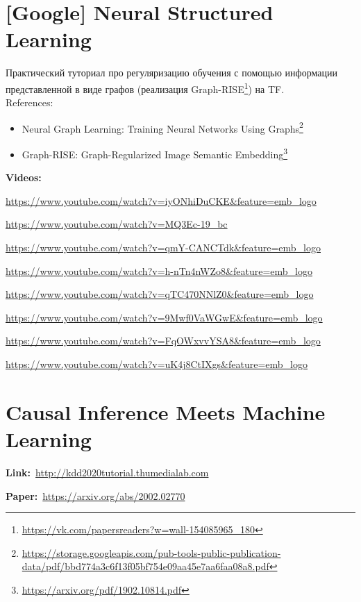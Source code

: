 
\newpage
\section*{[Google] Neural Structured Learning} 

Практический туториал про регуляризацию обучения с помощью информации представленной в виде графов (реализация Graph-RISE\footnote{\url{https://vk.com/papersreaders?w=wall-154085965_180}}) на TF. \\

References:

\begin{itemize}
    \item Neural Graph Learning: Training Neural Networks Using Graphs\footnote{\url{https://storage.googleapis.com/pub-tools-public-publication-data/pdf/bbd774a3c6f13f05bf754e09aa45e7aa6faa08a8.pdf}}
	\item Graph-RISE: Graph-Regularized Image Semantic Embedding\footnote{\url{https://arxiv.org/pdf/1902.10814.pdf}}
\end{itemize}

\textbf{Videos:}

\url{https://www.youtube.com/watch?v=iyONhiDuCKE&feature=emb_logo}

\url{https://www.youtube.com/watch?v=MQ3Ec-19_bc}

\url{https://www.youtube.com/watch?v=qmY-CANCTdk&feature=emb_logo}

\url{https://www.youtube.com/watch?v=h-nTn4nWZo8&feature=emb_logo}

\url{https://www.youtube.com/watch?v=qTC470NNlZ0&feature=emb_logo}

\url{https://www.youtube.com/watch?v=9Mwf0VaWGwE&feature=emb_logo}

\url{https://www.youtube.com/watch?v=FqOWxvvYSA8&feature=emb_logo}

\url{https://www.youtube.com/watch?v=uK4j8CtIXgs&feature=emb_logo}


\section*{Causal Inference Meets Machine Learning} 

\textbf{Link:}~\url{http://kdd2020tutorial.thumedialab.com}

\textbf{Paper:}~\url{https://arxiv.org/abs/2002.02770} \\

